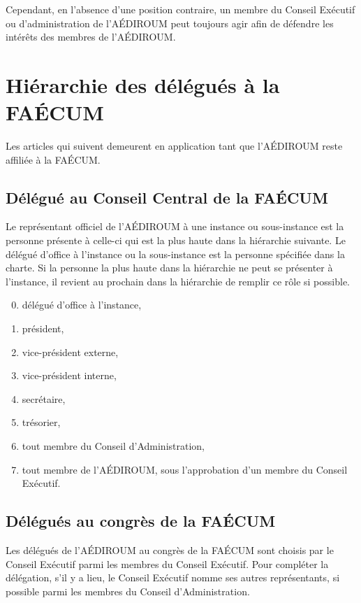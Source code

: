 \documentclass{aediroum}
\begin{document}
Cependant, en l'absence d'une position contraire, un membre du Conseil Exécutif ou d'administration de l'AÉDIROUM peut toujours agir afin de défendre les intérêts des membres de l'AÉDIROUM.

\section{Hiérarchie des délégués à la FAÉCUM}\label{sec:hierarchie-delegues-faecum}

Les articles qui suivent demeurent en application tant que l'AÉDIROUM reste affiliée à la FAÉCUM.

\subsection{Délégué au Conseil Central de la FAÉCUM}\label{sec:delegue-conseil-central}

Le représentant officiel de l'AÉDIROUM à une instance ou sous-instance est la personne présente à celle-ci qui est la plus haute dans la hiérarchie suivante. Le délégué d'office à l'instance ou la sous-instance est la personne spécifiée dans la charte. Si la personne la plus haute dans la hiérarchie ne peut se présenter à l'instance, il revient au prochain dans la hiérarchie de remplir ce rôle si possible.
\begin{enumerate}\setcounter{enumi}{-1}
\item délégué d'office à l'instance,
\item président,
\item vice-président externe,
\item vice-président interne,
\item secrétaire,
\item trésorier,
\item tout membre du Conseil d'Administration,
\item tout membre de l'AÉDIROUM, sous l'approbation d'un membre du Conseil Exécutif.
\end{enumerate}

\subsection{Délégués au congrès de la FAÉCUM}\label{sec:delegues-congres}
Les délégués de l'AÉDIROUM au congrès de la FAÉCUM sont choisis par le Conseil Exécutif parmi les membres du Conseil Exécutif. Pour compléter la délégation, s'il y a lieu, le Conseil Exécutif nomme ses autres représentants, si possible parmi les membres du Conseil d'Administration.
\end{document}
